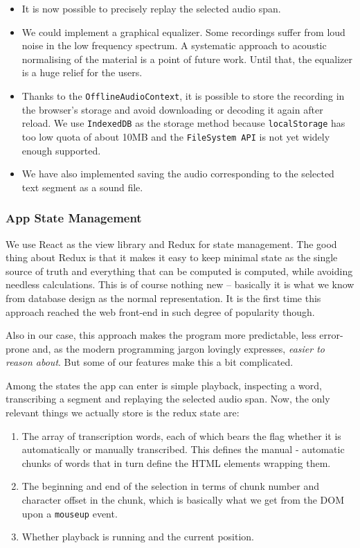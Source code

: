 \documentclass{svproc}
\begin{document}
\begin{itemize}
\item{It is now possible to precisely replay the selected audio span.}
\item{
    We could implement a graphical equalizer. Some recordings suffer from loud
    noise in the low frequency spectrum. A systematic approach to acoustic
    normalising of the material is a point of future work. Until that, the
    equalizer is a huge relief for the users.
}
\item{
    Thanks to the \texttt{OfflineAudioContext}, it is possible to store the
    recording in the browser's storage and avoid downloading or decoding it
    again after reload. We use \texttt{IndexedDB} as the storage method because
    \texttt{localStorage} has too low quota of about 10MB and the
    \texttt{FileSystem API} is not yet widely enough supported.
}
\item{
    We have also implemented saving the audio corresponding to the selected text
    segment as a sound file.
}
\end{itemize}

\subsubsection{App State Management}

We use React as the view library and Redux\cite{abramov2015redux} for state
management. The good thing about Redux is that it makes it easy to keep minimal
state as the single source of truth and everything that can be computed is
computed, while avoiding needless calculations. This is of course nothing new --
basically it is what we know from database design as the normal
representation.\cite{codd1970relational} It is the first time this approach
reached the web front-end in such degree of popularity though.

Also in our case, this approach makes the program more predictable, less
error-prone and, as the modern programming jargon lovingly expresses, {\em
easier to reason about}. But some of our features make this a bit complicated.

Among the states the app can enter is simple playback, inspecting a word,
transcribing a segment and replaying the selected audio span. Now, the only
relevant things we actually store is the redux state are:
\begin{enumerate}
\item{
    The array of transcription words, each of which bears the flag whether it is
    automatically or manually transcribed. This defines the manual - automatic
    chunks of words that in turn define the HTML elements wrapping them.
}
\item{
    The beginning and end of the selection in terms of chunk number and
    character offset in the chunk, which is basically what we get from the DOM
    upon a \texttt{mouseup} event.
}
\item{Whether playback is running and the current position.}
\end{enumerate}
\end{document}
